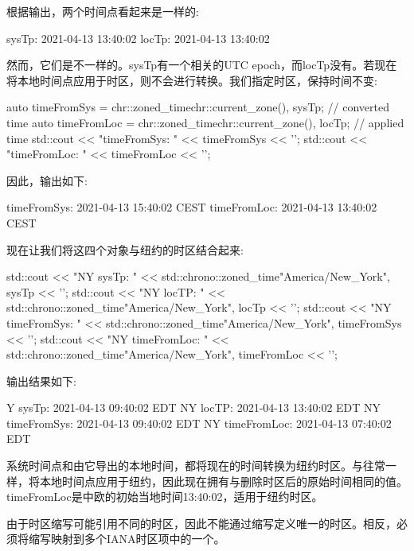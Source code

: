 根据输出，两个时间点看起来是一样的:

\begin{shell}
sysTp:     2021-04-13 13:40:02
locTp:     2021-04-13 13:40:02
\end{shell}

然而，它们是不一样的。sysTp有一个相关的UTC epoch，而locTp没有。若现在将本地时间点应用于时区，则不会进行转换。我们指定时区，保持时间不变:

\begin{cpp}
auto timeFromSys = chr::zoned_time{chr::current_zone(), sysTp}; // converted time
auto timeFromLoc = chr::zoned_time{chr::current_zone(), locTp}; // applied time
std::cout << "timeFromSys: " << timeFromSys << '\n';
std::cout << "timeFromLoc: " << timeFromLoc << '\n';
\end{cpp}

因此，输出如下:

\begin{shell}
timeFromSys: 2021-04-13 15:40:02 CEST
timeFromLoc: 2021-04-13 13:40:02 CEST
\end{shell}

现在让我们将这四个对象与纽约的时区结合起来:

\begin{cpp}
std::cout << "NY sysTp: "
		  << std::chrono::zoned_time{"America/New_York", sysTp} << '\n';
std::cout << "NY locTP: "
		  << std::chrono::zoned_time{"America/New_York", locTp} << '\n';
std::cout << "NY timeFromSys: "
		  << std::chrono::zoned_time{"America/New_York", timeFromSys} << '\n';
std::cout << "NY timeFromLoc: "
		  << std::chrono::zoned_time{"America/New_York", timeFromLoc} << '\n';
\end{cpp}

输出结果如下:

\begin{shell}
Y sysTp:        2021-04-13 09:40:02 EDT
NY locTP:       2021-04-13 13:40:02 EDT
NY timeFromSys: 2021-04-13 09:40:02 EDT
NY timeFromLoc: 2021-04-13 07:40:02 EDT
\end{shell}

系统时间点和由它导出的本地时间，都将现在的时间转换为纽约时区。与往常一样，将本地时间点应用于纽约，因此现在拥有与删除时区后的原始时间相同的值。timeFromLoc是中欧的初始当地时间13:40:02，适用于纽约时区。


由于时区缩写可能引用不同的时区，因此不能通过缩写定义唯一的时区。相反，必须将缩写映射到多个IANA时区项中的一个。

